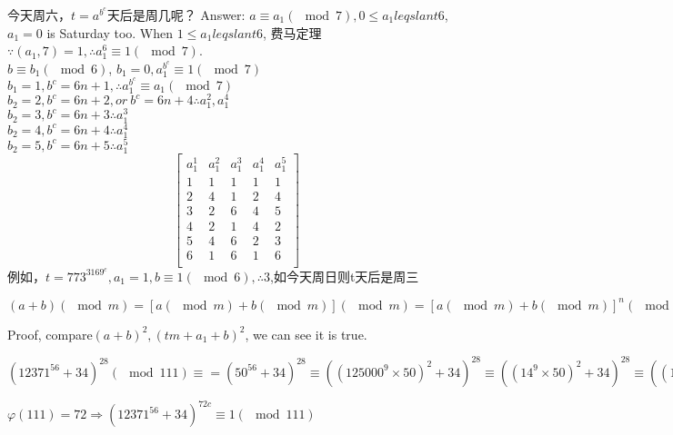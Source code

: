 \documentclass[UTF8]{../09-Mathematics}
\begin{document}
\begin{proposition}
    今天周六，$t = a^{b^c}$天后是周几呢？
    Answer: $a \equiv a_1(\mod 7), 0 \leqslant a_1 leqslant 6 $, $a_1 = 0$ is Saturday too. When $1 \leqslant a_1 leqslant 6$, 费马定理$\because (a_1, 7) =1, \therefore a_1^6 \equiv 1 (\mod 7)$. \\
    $b \equiv b_1(\mod 6)$, $b_1 = 0,a_1^{b^c}\equiv 1(\mod 7)$\\
    $b_1 = 1, b^c = 6n+1, \therefore a_1^{b^c}\equiv a_1(\mod 7)$\\
    $b_2 = 2, b^c = 6n+2,or\ b^c = 6n+4 \therefore a_1^{2}, a_1^{4}$\\
    $b_2 = 3, b^c = 6n+3 \therefore a_1^{3}$\\
    $b_2 = 4, b^c = 6n+4 \therefore a_1^{4}$\\
    $b_2 = 5, b^c = 6n+5 \therefore a_1^{5}$\\
    \begin{equation}
        \begin{bmatrix}
           a_1^1 & a_1^2 & a_1^3 & a_1^4 & a_1^5\\
           1 & 1 & 1 & 1 & 1\\
           2 & 4 & 1 & 2 & 4\\
           3 & 2 & 6 & 4 & 5\\
           4 & 2 & 1 & 4 & 2\\
           5 & 4 & 6 & 2 & 3\\
           6 & 1 & 6 & 1 & 6\\
        \end{bmatrix}
      \end{equation}
    例如，$t = 773^{3169^c}, a_1 = 1, b\equiv 1(\mod 6), \therefore 3$,如今天周日则t天后是周三
\end{proposition}


\begin{proposition}
    $(a+b)(\mod m) =[a(\mod m)+b(\mod m)](\mod m) =[a(\mod m)+b(\mod m)]^n(\mod m)$

    Proof, compare$ (a+b)^2, (tm+a_1 + b)^2$, we can see it is true.
\end{proposition}

\begin{proposition}
    $(12371^{56}+34)^{28}(\mod 111) 
    \equiv = (50^{56}+34)^{28}
    \equiv ((125000^9 \times 50)^2+34)^{28}
    \equiv ((14^9 \times 50)^2+34)^{28}
    \equiv ((14^9 \times 50)^2+34)^{28}
    \equiv ((80^3 \times 50)^2+34)^{28}
    \equiv ((68 \times 50)^2+34)^{28}
    \equiv ((70)^2+34)^{28}
    \equiv ((70)^2+34)^{28}
    \equiv 70
    $

    $\varphi(111) = 72 \Rightarrow (12371^{56}+34)^{72c} \equiv 1 (\mod 111)$
\end{proposition}
\end{document}
